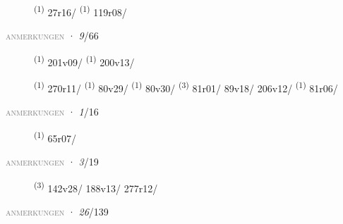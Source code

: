 \begin{description}
    \item[]  \textsuperscript{(1)} \mbox{27r16/} \textsuperscript{(1)} \mbox{119r08/}
\end{description}
\textsc{\textcolor{gray}{anmerkungen}}
\ENTRYEND
\noindent{} · \textit{9}/66 \LEMMALINE
\begin{description}
    \item[]  \textsuperscript{(1)} \mbox{201v09/} \CASEBREAK {} \textsuperscript{(1)} \mbox{200v13/}
    \item[]  \textsuperscript{(1)} \mbox{270r11/} \CASEBREAK {} \textsuperscript{(1)} \mbox{80v29/} \CASEBREAK {} \textsuperscript{(1)} \mbox{80v30/} \CASEBREAK {} \textsuperscript{(3)} \mbox{81r01/} \mbox{89v18/} \mbox{206v12/} \CASEBREAK {} \textsuperscript{(1)} \mbox{81r06/}
\end{description}
\textsc{\textcolor{gray}{anmerkungen}}
\ENTRYEND
\noindent{} · \textit{1}/16 \LEMMALINE
\begin{description}
    \item[]  \textsuperscript{(1)} \mbox{65r07/}
\end{description}
\textsc{\textcolor{gray}{anmerkungen}}
\ENTRYEND
\noindent{} · \textit{3}/19 \LEMMALINE
\begin{description}
    \item[]  \textsuperscript{(3)} \mbox{142v28/} \mbox{188v13/} \mbox{277r12/}
\end{description}
\textsc{\textcolor{gray}{anmerkungen}}
\ENTRYEND
\noindent{} · \textit{26}/139 \LEMMALINE
